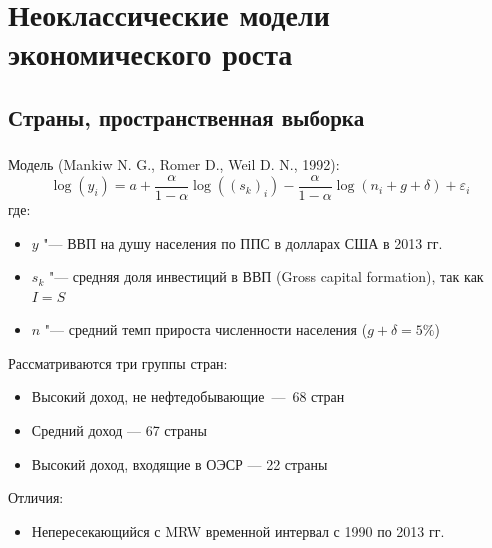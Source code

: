\documentclass[c, dvipsnames]{beamer}  %
\begin{document}
\section{Неоклассические модели экономического роста}
\subsection{Страны, пространственная выборка}

\begin{frame}[shrink=5]
\frametitle{\insertsection} 
\framesubtitle{\insertsubsection}
Модель (Mankiw N. G., Romer D., Weil D. N., 1992): 
\begin{equation} 
\log(y_i)=a+\frac{\alpha}{1-\alpha}\log((s_k)_i)-\frac{\alpha}{1-\alpha}\log(n_i+g+\delta)+\varepsilon_i
\end{equation}
где: 
\begin{itemize}
\item $y$ "--- ВВП на душу населения по ППС  в долларах США в 2013 гг.
\item $s_k$ "--- средняя доля инвестиций в  ВВП (Gross capital formation), так как $I=S$
\item $n$ "--- средний темп прироста  численности населения  ($g+\delta=5\%$)
\end{itemize}
Рассматриваются три группы стран:
\begin{itemize}
\item Высокий доход, не нефтедобывающие~---~68 стран 
\item Средний доход --- 67 страны
\item Высокий доход, входящие в ОЭСР --- 22 страны
\end{itemize}
Отличия:
\begin{itemize}
	\item Непересекающийся с MRW временной интервал с 1990 по 2013 гг.

\end{itemize}
\end{frame}
\end{document}
